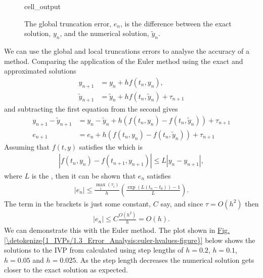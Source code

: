 \documentclass[letterpaper,10pt,english]{jupyterBook}
\begin{document}
\begin{figure}[htbp]
\centering
\capstart
\begin{sphinxVerbatimOutput}

\begin{sphinxuseclass}{cell_output}
\noindent{}

\end{sphinxuseclass}\end{sphinxVerbatimOutput}
\caption{The global truncation error, \(e_n\), is the difference between the exact solution, \(y_n\), and the numerical solution, \(\tilde{y}_n\).}\label{\detokenize{1_IVPs/1.3_Error_Analysis:gte-figure}}\end{figure}

\sphinxAtStartPar
We can use the global and local truncations errors to analyse the accuracy of a method. Comparing the application of the Euler method using the exact and approximated solutions
\begin{align*}
    y_{n+1} &= y_{n} + hf(t_n, y_n), \\
    \tilde{y}_{n+1} &= \tilde{y}_n + hf(t_n, \tilde{y}_n) + \tau_{n+1}
\end{align*}
\sphinxAtStartPar
and subtracting the first equation from the second gives
\begin{align*}
    y_{n+1} - \tilde{y}_{n+1} &= y_n - \tilde{y}_n + h(f(t_n, y_n) - f(t_n, \tilde{y}_n)) + \tau_{n+1} \\
    e_{n+1} &= e_n + h(f(t_n, y_n) - f(t_n, \tilde{y}_n)) + \tau_{n+1} 
\end{align*}
\sphinxAtStartPar
Assuming that \(f(t,y)\) satisfies the  which is
\begin{align*}
    |f(t_n, y_n) - f(t_{n+1}, y_{n+1})| \leq L|y_n - y_{n+1}|,
\end{align*}
\sphinxAtStartPar
where \(L\) is the , then it can be shown that \(e_n\) satisfies
\begin{align*}
    |e_n| \leq \frac{\max_i (\tau_i)}{h} \left(\frac{\exp(L(t_n - t_0)) - 1}{L}\right).
\end{align*}
\sphinxAtStartPar
The term in the brackets is just some constant, \(C\) say, and since \(\tau = O(h^2)\) then
\begin{align*}
    |e_n| \leq C\frac{O(h^2)}{h} = O(h).
\end{align*}
\sphinxAtStartPar
We can demonstrate this with the Euler method. The plot shown in \hyperref[\detokenize{1_IVPs/1.3_Error_Analysis:euler-hvalues-figure}]{Fig.\@ \ref{\detokenize{1_IVPs/1.3_Error_Analysis:euler-hvalues-figure}}} below shows the solutions to the IVP from {\hyperref[\detokenize{1_IVPs/1.2_Euler_Method:euler-example}]{}} calculated using step lengths of \(h=0.2\), \(h=0.1\), \(h=0.05\) and \(h=0.025\). As the step length decreases the numerical solution gets closer to the exact solution as expected.
\end{document}
